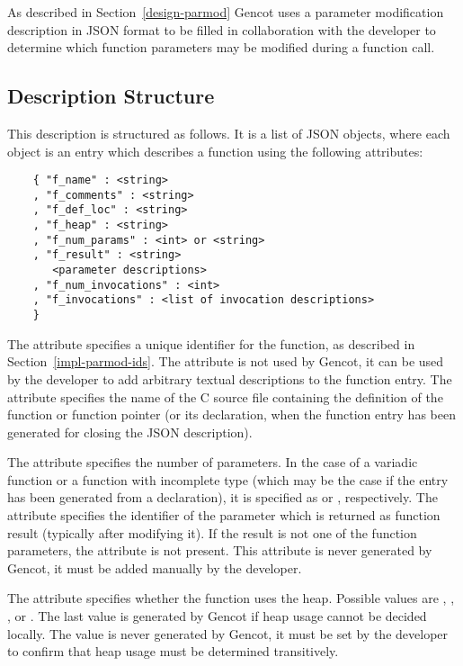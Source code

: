As described in Section~\ref{design-parmod} Gencot uses a parameter modification description in JSON format 
to be filled in collaboration with the developer to determine which function parameters may be modified during
a function call. 

\subsection{Description Structure}
\label{impl-parmod-struct}

This
description is structured as follows. It is a list of JSON objects, where each object is an entry which describes a function using
the following attributes:
\begin{verbatim}
    { "f_name" : <string>
    , "f_comments" : <string>
    , "f_def_loc" : <string>
    , "f_heap" : <string>
    , "f_num_params" : <int> or <string>
    , "f_result" : <string>
       <parameter descriptions>
    , "f_num_invocations" : <int>
    , "f_invocations" : <list of invocation descriptions>
    }
\end{verbatim}

The attribute  specifies a unique identifier for the function, as described in Section~\ref{impl-parmod-ids}.
The attribute  is not used by Gencot, it can be used by the developer to add arbitrary textual
descriptions to the function entry. The attribute  specifies the name of the C source file containing
the definition of the function or function pointer (or its declaration, when the function entry has been 
generated for closing the JSON description). 

The attribute  specifies the number of parameters. In the case of a variadic function or a function
with incomplete type (which may be the case if the entry has been generated from a declaration), it is specified
as  or , respectively. The attribute  specifies the identifier of
the parameter which is returned as function result (typically after modifying it). If the result is not one of the 
function parameters, the attribute is not present. This attribute is never generated by Gencot, it must be added manually
by the developer. 

The attribute  specifies whether the function uses the heap. Possible values are , ,
, or . The last value is generated by Gencot if heap usage cannot be decided locally.
The value  is never generated by Gencot, it must be set by the developer to confirm that heap usage 
must be determined transitively.

